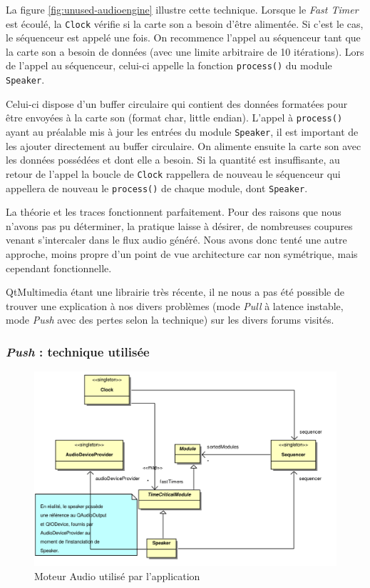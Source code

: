 La figure \ref{fig:unused-audioengine} illustre cette technique.
Lorsque le \emph{Fast Timer} est écoulé, la \verb!Clock! vérifie si
la carte son a besoin d'être alimentée. Si c'est le cas, le
séquenceur est appelé une fois. On recommence l'appel au séquenceur
tant que la carte son a besoin de données (avec une limite
arbitraire de 10 itérations). Lors de l'appel au séquenceur,
celui-ci appelle la fonction \verb!process()! du module
\verb!Speaker!.

Celui-ci dispose d'un buffer circulaire qui contient des données
formatées pour être envoyées à la carte son (format char, little
endian). L'appel à \verb!process()! ayant au préalable mis à jour
les entrées du module \verb!Speaker!, il est important de les
ajouter directement au buffer circulaire. On alimente ensuite la
carte son avec les données possédées et dont elle a besoin. Si la
quantité est insuffisante, au retour de l'appel la boucle de
\verb!Clock! rappellera de nouveau le séquenceur qui appellera de
nouveau le \verb!process()! de chaque module, dont \verb!Speaker!.

La théorie et les traces fonctionnent parfaitement. Pour des
raisons que nous n'avons pas pu déterminer, la pratique laisse à
désirer, de nombreuses coupures venant s'intercaler dans le flux
audio généré. Nous avons donc tenté une autre approche, moins
propre d'un point de vue architecture car non symétrique, mais
cependant fonctionnelle.

QtMultimedia étant une librairie très récente, il ne nous a pas été
possible de trouver une explication à nos divers problèmes (mode
\emph{Pull} à latence instable, mode \emph{Push} avec des pertes
selon la technique) sur les divers forums visités.

\subsubsection{\emph{Push} : technique utilisée}

\begin{figure}[ht]
\centering
\includegraphics[width=17cm]{../img/ps/psm_currentAudioEngine.pdf}
\caption{Moteur Audio utilisé par l'application}
\label{fig:audioengine}
\end{figure}

